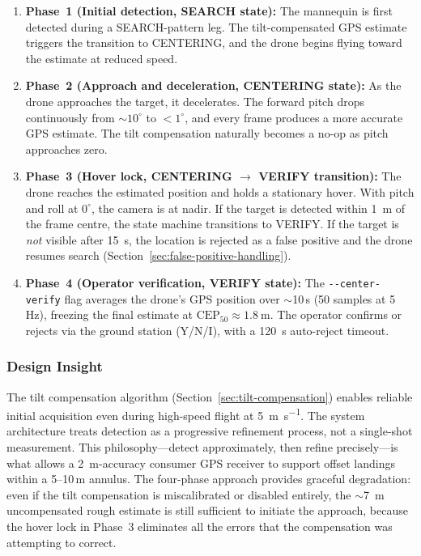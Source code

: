 \begin{enumerate}
  \item \textbf{Phase~1 (Initial detection, SEARCH state):} The mannequin is first detected during a SEARCH-pattern leg.  The tilt-compensated GPS estimate triggers the transition to CENTERING, and the drone begins flying toward the estimate at reduced speed.

  \item \textbf{Phase~2 (Approach and deceleration, CENTERING state):} As the drone approaches the target, it decelerates.  The forward pitch drops continuously from $\sim$$10^{\circ}$ to $< 1^{\circ}$, and every frame produces a more accurate GPS estimate.  The tilt compensation naturally becomes a no-op as pitch approaches zero.

  \item \textbf{Phase~3 (Hover lock, CENTERING $\to$ VERIFY transition):} The drone reaches the estimated position and holds a stationary hover.  With pitch and roll at $0^{\circ}$, the camera is at nadir.  If the target is detected within \SI{1}{\metre} of the frame centre, the state machine transitions to VERIFY.  If the target is \emph{not} visible after \SI{15}{\second}, the location is rejected as a false positive and the drone resumes search (Section~\ref{sec:false-positive-handling}).

  \item \textbf{Phase~4 (Operator verification, VERIFY state):} The \texttt{-{}-center-verify} flag averages the drone's GPS position over $\sim$10\,s (50 samples at 5\,Hz), freezing the final estimate at $\text{CEP}_{50} \approx \SI{1.8}{\metre}$.  The operator confirms or rejects via the ground station (Y/N/I), with a \SI{120}{\second} auto-reject timeout.
\end{enumerate}

\subsubsection{Design Insight}

The tilt compensation algorithm (Section~\ref{sec:tilt-compensation}) enables reliable initial acquisition even during high-speed flight at \SI{5}{\metre\per\second}.  The system architecture treats detection as a progressive refinement process, not a single-shot measurement.  This philosophy---detect approximately, then refine precisely---is what allows a \SI{2}{\metre}-accuracy consumer GPS receiver to support offset landings within a 5--10\,m annulus.  The four-phase approach provides graceful degradation: even if the tilt compensation is miscalibrated or disabled entirely, the $\sim$\SI{7}{\metre} uncompensated rough estimate is still sufficient to initiate the approach, because the hover lock in Phase~3 eliminates all the errors that the compensation was attempting to correct.

